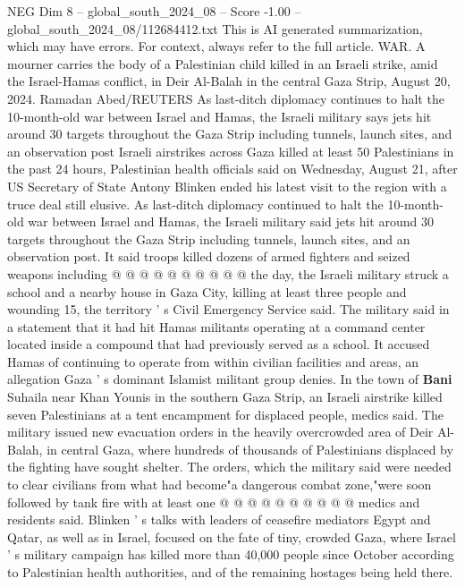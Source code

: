 \begin{textsample}{NEG Dim 8 – global\_south\_2024\_08 – Score -1.00 – global\_south\_2024\_08/112684412.txt}  \label{ex:f8_neg_287}
This is AI generated summarization, which may have errors.
For context, always refer to the full article.
WAR.
A mourner carries the body of a Palestinian child killed in an Israeli strike, amid the Israel-Hamas conflict, in Deir Al-Balah in the central Gaza Strip, August 20, 2024.
Ramadan Abed/REUTERS As last-ditch diplomacy continues to halt the 10-month-old war between Israel and Hamas, the Israeli military says jets hit around 30 targets throughout the Gaza Strip including tunnels, launch sites, and an observation post Israeli airstrikes across Gaza killed at least 50 Palestinians in the past 24 hours, Palestinian health officials said on Wednesday, August 21, after US Secretary of State Antony Blinken ended his latest visit to the region with a truce deal still elusive.
As last-ditch diplomacy continued to halt the 10-month-old war between Israel and Hamas, the Israeli military said jets hit around 30 targets throughout the Gaza Strip including tunnels, launch sites, and an observation post.
It said troops killed dozens of armed fighters and seized weapons including @ @ @ @ @ @ @ @ @ @ the day, the Israeli military struck a school and a nearby house in Gaza City, killing at least three people and wounding 15, the territory ' s Civil Emergency Service said.
The military said in a statement that it had hit Hamas militants operating at a command center located inside a compound that had previously served as a school.
It accused Hamas of continuing to operate from within civilian facilities and areas, an allegation Gaza ' s dominant Islamist militant group denies.
In the town of \textbf{Bani} Suhaila near Khan Younis in the southern Gaza Strip, an Israeli airstrike killed seven Palestinians at a tent encampment for displaced people, medics said.
The military issued new evacuation orders in the heavily overcrowded area of Deir Al-Balah, in central Gaza, where hundreds of thousands of Palestinians displaced by the fighting have sought shelter.
The orders, which the military said were needed to clear civilians from what had become"a dangerous combat zone,"were soon followed by tank fire with at least one @ @ @ @ @ @ @ @ @ @ medics and residents said.
Blinken ' s talks with leaders of ceasefire mediators Egypt and Qatar, as well as in Israel, focused on the fate of tiny, crowded Gaza, where Israel ' s military campaign has killed more than 40,000 people since October according to Palestinian health authorities, and of the remaining hostages being held there.

\end{textsample}
